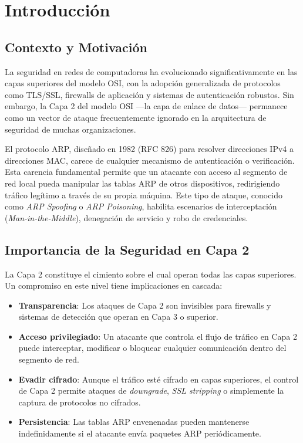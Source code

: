 \documentclass[12pt, a4paper]{article}
\begin{document}
\newpage

\section{Introducci\'on}

\subsection{Contexto y Motivaci\'on}

La seguridad en redes de computadoras ha evolucionado significativamente en las capas superiores del modelo OSI, con la adopci\'on generalizada de protocolos como TLS/SSL, firewalls de aplicaci\'on y sistemas de autenticaci\'on robustos. Sin embargo, la Capa 2 del modelo OSI ---la capa de enlace de datos--- permanece como un vector de ataque frecuentemente ignorado en la arquitectura de seguridad de muchas organizaciones.

El protocolo ARP, dise\~nado en 1982 (RFC 826) para resolver direcciones IPv4 a direcciones MAC, carece de cualquier mecanismo de autenticaci\'on o verificaci\'on. Esta carencia fundamental permite que un atacante con acceso al segmento de red local pueda manipular las tablas ARP de otros dispositivos, redirigiendo tr\'afico leg\'itimo a trav\'es de su propia m\'aquina. Este tipo de ataque, conocido como \textit{ARP Spoofing} o \textit{ARP Poisoning}, habilita escenarios de interceptaci\'on (\textit{Man-in-the-Middle}), denegaci\'on de servicio y robo de credenciales.

\subsection{Importancia de la Seguridad en Capa 2}

La Capa 2 constituye el cimiento sobre el cual operan todas las capas superiores. Un compromiso en este nivel tiene implicaciones en cascada:

\begin{itemize}[leftmargin=2cm]
    \item \textbf{Transparencia}: Los ataques de Capa 2 son invisibles para firewalls y sistemas de detecci\'on que operan en Capa 3 o superior.
    \item \textbf{Acceso privilegiado}: Un atacante que controla el flujo de tr\'afico en Capa 2 puede interceptar, modificar o bloquear cualquier comunicaci\'on dentro del segmento de red.
    \item \textbf{Evadir cifrado}: Aunque el tr\'afico est\'e cifrado en capas superiores, el control de Capa 2 permite ataques de \textit{downgrade}, \textit{SSL stripping} o simplemente la captura de protocolos no cifrados.
    \item \textbf{Persistencia}: Las tablas ARP envenenadas pueden mantenerse indefinidamente si el atacante env\'ia paquetes ARP peri\'odicamente.
\end{itemize}
\end{document}
